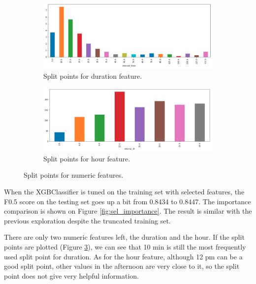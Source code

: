 \documentclass[a4paper]{article}
\begin{document}
			\begin{figure}
				\centering
				\begin{subfigure}[b]{1\textwidth}
					\centering
					\includegraphics[width=1\textwidth]{SelDurationSplit.png}
					\caption{\label{fig:sel_duration_split}Split points for duration feature.}
				\end{subfigure}					
				\begin{subfigure}[b]{1\textwidth}
					\centering
					\includegraphics[width=1\textwidth]{SelHourSplit.png}
					\caption{\label{fig:sel_hour_split}Split points for hour feature.}		
				\end{subfigure}
				\caption{Split points for numeric features.}
				\label{fig:sel_split}
			\end{figure}		
			
			When the XGBClassifier is tuned on the training set with selected features, the F0.5 score on the testing set goes up a bit from 0.8434 to 0.8447. The importance comparison is shown on Figure \ref{fig:sel_importance}. The result is similar with the previous exploration despite the truncated training set.
			
			There are only two numeric features left, the duration and the hour. If the split points are plotted (Figure \ref{fig:sel_split}), we can see that 10 min is still the most frequently used split point for duration. As for the hour feature, although 12 pm can be a good split point, other values in the afternoon are very close to it, so the split point does not give very helpful information.			
			
\end{document}
